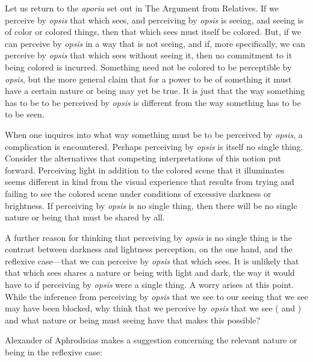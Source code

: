 Let us return to the \emph{aporia} set out in The Argument from Relatives. If we perceive by \emph{opsis} that which sees, and perceiving by \emph{opsis} is seeing, and seeing is of color or colored things, then that which sees must itself be colored. But, if we can perceive by \emph{opsis} in a way that is not seeing, and if, more specifically, we can perceive by \emph{opsis} that which sees without seeing it, then no commitment to it being colored is incurred. Something need not be colored to be perceptible by \emph{opsis}, but the more general claim that for a power to be of something it must have a certain nature or being may yet be true. It is just that the way something has to be to be perceived by \emph{opsis} is different from the way something has to be to be seen.

When one inquires into what way something must be to be perceived by \emph{opsis}, a complication is encountered. Perhaps perceiving by \emph{opsis} is itself no single thing. Consider the alternatives that competing interpretations of this notion put forward. Perceiving light in addition to the colored scene that it illuminates seems different in kind from the visual experience that results from trying and failing to see the colored scene under conditions of excessive darkness or brightness. If perceiving by \emph{opsis} is no single thing, then there will be no single nature or being that must be shared by all. 

A further reason for thinking that perceiving by \emph{opsis} is no single thing is the contrast between darkness and lightness perception, on the one hand, and the reflexive case—that we can perceive by \emph{opsis} that which sees. It is unlikely that that which sees shares a nature or being with light and dark, the way it would have to if perceiving by \emph{opsis} were a single thing. A worry arises at this point. While the inference from perceiving by \emph{opsis} that we see to our seeing that we see may have been blocked, why think that we perceive by \emph{opsis} that we see (\citealt[122]{Hamlyn:1961ys} and \citealt[203]{Corkum:2010fa}) and what nature or being must seeing have that makes this possible?  

Alexander of Aphrodisias makes a suggestion concerning the relevant nature or being in the reflexive case:
\begin{quote}
	
\end{quote}


